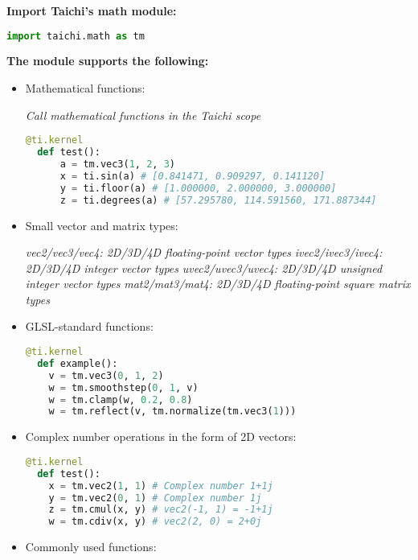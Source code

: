 \documentclass[10pt,landscape,a4paper]{article}
\newenvironment{myboxed}[1]
{\begin{mdframed}[linecolor=black,
                  backgroundcolor=white,
                  outerlinewidth=0.25pt,
                  innertopmargin=1ex,
                  topline=true,
                  rightline=true,
                  leftline=true,
                  bottomline=true,
                  linecolor=black!0,
                  frametitleaboveskip=0.5em,
                  frametitlebelowskip=0.5em,
                  innerbottommargin=.5\baselineskip,
                  innerrightmargin=.5em,
                  innerleftmargin=.5em,
                  frametitle={\footnotesize \RobotoSlab \bfseries \hspace*{0mm} #1},
                  frametitlebackgroundcolor=black!5,
                  frametitlerulewidth=2pt]}
{\end{mdframed}}
\begin{document}
\begin{multicols*}{5}
  \begin{myboxed}{Math}
  \textbf{Import Taichi’s math module:}
  \begin{lstlisting}[language=Python]
  import taichi.math as tm
  \end{lstlisting}

  \textbf{The module supports the following:}
  \begin{itemize}
  \item Mathematical functions:
  
  \textit{Call mathematical functions in the Taichi scope}
  \begin{lstlisting}[language=Python]
  @ti.kernel
  def test():
      a = tm.vec3(1, 2, 3)
      x = ti.sin(a) # [0.841471, 0.909297, 0.141120]
      y = ti.floor(a) # [1.000000, 2.000000, 3.000000]
      z = ti.degrees(a) # [57.295780, 114.591560, 171.887344]
  \end{lstlisting}
  
  \item Small vector and matrix types:

  \textit{vec2/vec3/vec4: 2D/3D/4D floating-point vector types}
  \textit{ivec2/ivec3/ivec4: 2D/3D/4D integer vector types}
  \textit{uvec2/uvec3/uvec4: 2D/3D/4D unsigned integer vector types}
  \textit{mat2/mat3/mat4: 2D/3D/4D floating-point square matrix types}
  
  \item GLSL-standard functions:
  \begin{lstlisting}[language=Python]
  @ti.kernel
  def example():
    v = tm.vec3(0, 1, 2)
    w = tm.smoothstep(0, 1, v)
    w = tm.clamp(w, 0.2, 0.8)
    w = tm.reflect(v, tm.normalize(tm.vec3(1)))
  \end{lstlisting}
  
  \item Complex number operations in the form of 2D vectors:
  \begin{lstlisting}[language=Python]
  @ti.kernel
  def test():
    x = tm.vec2(1, 1) # Complex number 1+1j
    y = tm.vec2(0, 1) # Complex number 1j
    z = tm.cmul(x, y) # vec2(-1, 1) = -1+1j
    w = tm.cdiv(x, y) # vec2(2, 0) = 2+0j
  \end{lstlisting}

  \item Commonly used functions:


\end{itemize}
\end{myboxed}
\end{multicols*}
\end{document}
